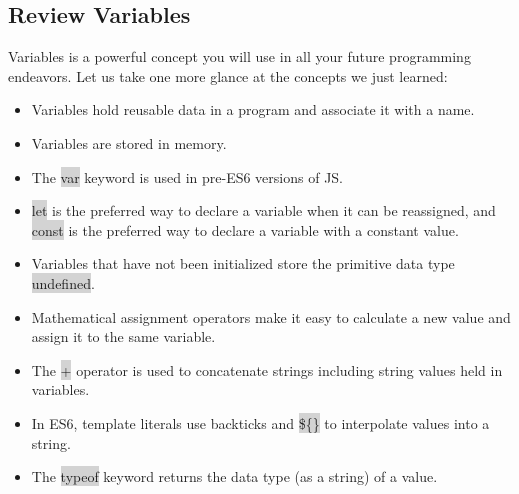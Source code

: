 \documentclass[11pt]{article}
\begin{document}
\subsection{Review Variables}
Variables is a powerful concept you will use in all your future programming endeavors. Let us take one more glance at the concepts we just learned:
\begin{itemize}[leftmargin = *]
\item Variables hold reusable data in a program and associate it with a name. 
\item Variables are stored in memory.
\item The \colorbox{lightgray}{var} keyword is used in pre-ES6 versions of JS. 
\item \colorbox{lightgray}{let} is the preferred way to declare a variable when it can be reassigned, and \colorbox{lightgray}{const} is the preferred way to declare a variable with a constant value.
\item Variables that have not been initialized store the primitive data type \colorbox{lightgray}{undefined}. 
\item Mathematical assignment operators make it easy to calculate a new value and assign it to the same variable. 
\item The \colorbox{lightgray}{+} operator is used to concatenate strings including string values held in variables. 
\item In ES6, template literals use backticks \colorbox{lightgray}{\textasciigrave} and \colorbox{lightgray}{\$\{\}} to interpolate values into a string.
\item The \colorbox{lightgray}{typeof} keyword returns the data type (as a string) of a value.
\end{itemize}
\end{document}
